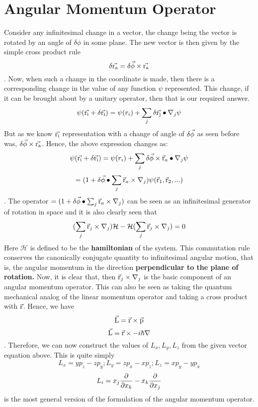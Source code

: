 \documentclass[12pt]{article}
\begin{document}
\section{Angular Momentum Operator}
Consider any infinitesimal change in a vector, the change being the vector is rotated by an angle of $\delta\phi$ in some plane. The new vector is then given by the simple cross product rule $$\delta\vec{\mathrm{r_{a}}} = {\delta\vec{\mathrm{\phi}}}\times{\ensuremath{\vec{\mathrm{r_{a}}}}}$$. Now, when such a change in the coordinate is made, then there is a corresponding change in the value of any function $\psi$ represented. This change, if it can be brought about by a unitary operator, then that is our required answer. $$\psi (\vec{\mathrm{r_{i}}}+\delta\vec{\mathrm{r_{i}}}) = \psi(r_{i}) + \sum_j \delta{\ensuremath{\vec{\mathrm{r_{j}}}}}\bullet{\ensuremath{\nabla}_{j}\psi}$$
But as we know $\vec{\mathrm{r_{i}}}$ representation with a change of angle of $\delta\vec{\mathrm{\phi}}$ as seen before was, ${\delta\vec{\mathrm{\phi}}}\times{\ensuremath{\vec{\mathrm{r_{a}}}}}$. Hence, the above expression changes as:	
$$\psi (\vec{\mathrm{r_{i}}}+\delta\vec{\mathrm{r_{i}}}) = \psi(r_{i}) + \sum_j {\delta\vec{\mathrm{\phi}}}\times{\ensuremath{{\vec{\mathrm{r}}_{a}}\bullet{\ensuremath{\nabla}_{j}\psi}}}$$
$$=(1+{\delta\vec{\mathrm{\phi}}}\bullet{\sum_j \ensuremath{{\vec{\mathrm{r}}_{a}}\times{\ensuremath{\nabla}_{j}}}})\psi(\vec{\mathrm{r}}_1,\vec{\mathrm{r}}_2,...)$$. The operator $=(1+{\delta\vec{\mathrm{\phi}}}\bullet{\sum_j \ensuremath{{\vec{\mathrm{r}}_{a}}\times{\ensuremath{\nabla}_{j}}}})$ can be seen as an infinitesimal generator of rotation in space and it is also clearly seen that $$(\sum_j{\vec{\mathrm{r}}_j}\times{\ensuremath{\nabla}_j})\mathcal{H}-\mathcal{H}(\sum_j{\vec{\mathrm{r}}_j}\times{\ensuremath{\nabla}_j}) = 0$$ Here $\mathcal{H}$ is defined to be the \textbf{hamiltonian} of the system. This commutation rule conserves the canonically conjugate quantity to infinitesimal angular motion, that is, the angular momentum in the direction \textbf{perpendicular to the plane of rotation.} Now, it is clear that, then ${\vec{\mathrm{r}}_j}\times{\ensuremath{\nabla}_j}$ is the basic component of an angular momentum operator. This can also be seen as taking the quantum mechanical analog of the linear momentum operator and taking a cross product with $\vec{\mathrm{r}}$. Hence, we have $$\vec{\mathrm{L}} = {\vec{\mathrm{r}}}\times{\ensuremath{\vec{\mathrm{p}}}}$$ $$\vec{\mathrm{L}} = {\vec{\mathrm{r}}}\times{-i\hbar\ensuremath{\nabla}}$$. Therefore, we can now construct the values of $L_x, L_y, L_z$ from the given vector equation above. This is quite simply
$$L_x = yp_z - zp_y; L_y = zp_x - xp_z; L_z = xp_y - yp_x$$
$$L_i = x_j\frac{\partial{}}{\partial{x_k}} - x_k\frac{\partial{}}{\partial{x_j}}$$ is the most general version of the formulation of the angular momentum operator.
\end{document}
